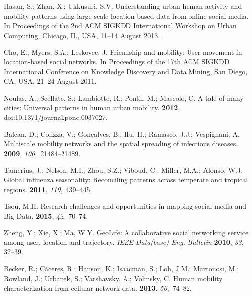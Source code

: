 \documentclass[ijgi,article,accept,moreauthors,pdftex,10pt,a4paper]{mdpi}
\theoremstyle{mdpi}
\newcounter{re}
\theoremstyle{mdpidefinition}
\begin{document}
\begin{thebibliography}{-------}
Hasan, S.; Zhan, X.; Ukkusuri, S.V.
\newblock Understanding urban human activity and mobility patterns using
  large-scale location-based data from online social media.
\newblock  In Proceedings of the 2nd ACM SIGKDD International Workshop on Urban
  Computing, Chicago, IL, USA, 11--14 August 2013.

Cho, E.; Myers, S.A.; Leskovec, J.
\newblock Friendship and mobility: User movement in location-based social
  networks.
\newblock  In Proceedings of the 17th ACM SIGKDD International Conference on
  Knowledge Discovery and Data Mining, San Diego, CA, USA, 21--24 August 2011.

Noulas, A.; Scellato, S.; Lambiotte, R.; Pontil, M.; Mascolo, C.
\newblock A tale of many cities: Universal patterns in human urban mobility.
 {\bf 2012}, doi:10.1371/journal.pone.0037027.

Balcan, D.; Colizza, V.; Gon{\c{c}}alves, B.; Hu, H.; Ramasco, J.J.;
  Vespignani, A.
\newblock Multiscale mobility networks and the spatial spreading of infectious
  diseases.
 {\bf 2009},
  {\em 106},~21484--21489.

Tamerius, J.; Nelson, M.I.; Zhou, S.Z.; Viboud, C.; Miller, M.A.; Alonso, W.J.
\newblock Global influenza seasonality: Reconciling patterns across temperate
  and tropical regions.
 {\bf 2011}, {\em 119},~439--445.

Tsou, M.H.
\newblock Research challenges and opportunities in mapping social media and Big
  Data.
 {\bf 2015}, {\em
  42},~70--74.


Zheng, Y.; Xie, X.; Ma, W.Y.
\newblock GeoLife: A collaborative social networking service among user,
  location and trajectory. {\em IEEE Data(base) Eng. Bulletin} {\bf 2010}, {\em 33}, 32--39.



Becker, R.; C{\'a}ceres, R.; Hanson, K.; Isaacman, S.; Loh, J.M.; Martonosi,
  M.; Rowland, J.; Urbanek, S.; Varshavsky, A.; Volinsky, C.
\newblock Human mobility characterization from cellular network data.
 {\bf 2013}, {\em 56},~74--82.



\end{thebibliography}
\end{document}

